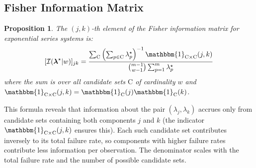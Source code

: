 \documentclass[pdflatex,sn-mathphys-num,Numbered]{sn-jnl}
\newcommand{\RV}[1]{\mathrm{#1}}
\newcommand{\cand}{\RV{C}}         %
\newcommand{\tparam}[1]{{#1}^{\star}}  %
\newcommand{\infomatrx}{\mathcal{I}}
\renewcommand{\vec}[1]{\boldsymbol{#1}}
\newcommand{\SetIndicator}[1]{\mathbbm{1}_{#1}}
\theoremstyle{thmstyleone}
\newtheorem{proposition}[theorem]{Proposition}
\theoremstyle{thmstylethree}
\theoremstyle{thmstyletwo}
\begin{document}
\subsection{Fisher Information Matrix}

\begin{proposition}
\label{prop:expo_fisher}
The $(j,k)$-th element of the Fisher information matrix for exponential series systems is:
\begin{equation}
\label{eq:expo_fisher_element}
[\infomatrx(\tparam{\vec{\lambda}} | w)]_{jk} = \frac{\sum_{\cand} \left(\sum_{p \in \cand} \tparam{\lambda}_p\right)^{-1} \SetIndicator{\cand \times \cand}(j,k)}{\binom{m-1}{w-1} \sum_{p=1}^{m} \tparam{\lambda}_p}
\end{equation}
where the sum is over all candidate sets $\cand$ of cardinality $w$ and $\SetIndicator{\cand \times \cand}(j,k) = \SetIndicator{\cand}(j)\SetIndicator{\cand}(k)$.
\end{proposition}

This formula reveals that information about the pair $(\lambda_j, \lambda_k)$ accrues only from candidate sets containing both components $j$ and $k$ (the indicator $\SetIndicator{\cand \times \cand}(j,k)$ ensures this). Each such candidate set contributes inversely to its total failure rate, so components with higher failure rates contribute less information per observation. The denominator scales with the total failure rate and the number of possible candidate sets.
\end{document}
